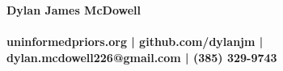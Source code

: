 \documentclass[letterpaper]{deedy-resume}
\begin{document}
\begin{flushleft}
  {\Huge \textbf{Dylan James McDowell}\\}
  \vspace{-3.5mm}
  {\large\textbf{\\uninformedpriors.org | github.com/dylanjm | dylan.mcdowell226@gmail.com | (385) 329-9743}}
\end{flushleft}


\vspace{-3mm}
\hspace{-6.5mm}
\end{document}
